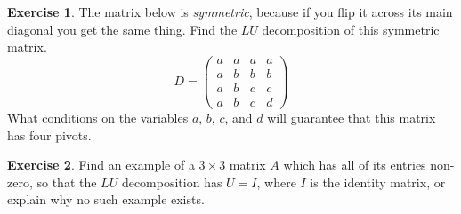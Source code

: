 \documentclass[11pt]{amsart}
\theoremstyle{definition}
\newtheorem{exercise}{Exercise}
\begin{document}
\begin{exercise}
The matrix below is \emph{symmetric}, because if you flip it across its main diagonal you get the same thing. Find the $LU$ decomposition of this symmetric matrix.
\[
D =
\begin{pmatrix}
a & a & a & a \\
a & b & b & b \\
a & b & c & c \\
a & b & c & d
\end{pmatrix}
\]
What conditions on the variables $a$, $b$, $c$, and $d$ will guarantee that this matrix has four pivots.
\end{exercise}

\begin{exercise}
Find an example of a $3\times 3$ matrix $A$ which has all of its entries non-zero, so that the $LU$ decomposition has $U = I$, where $I$ is the identity matrix, or explain why no such example exists.
\end{exercise}
\end{document}
